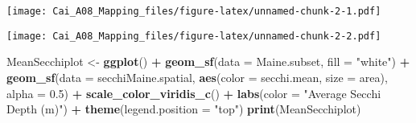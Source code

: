 \documentclass[]{article}
\newenvironment{Shaded}{\begin{snugshade}}{\end{snugshade}}
\newcommand{\CommentTok}[1]{\textcolor[rgb]{0.56,0.35,0.01}{\textit{#1}}}
\newcommand{\DataTypeTok}[1]{\textcolor[rgb]{0.13,0.29,0.53}{#1}}
\newcommand{\DecValTok}[1]{\textcolor[rgb]{0.00,0.00,0.81}{#1}}
\newcommand{\FloatTok}[1]{\textcolor[rgb]{0.00,0.00,0.81}{#1}}
\newcommand{\KeywordTok}[1]{\textcolor[rgb]{0.13,0.29,0.53}{\textbf{#1}}}
\newcommand{\NormalTok}[1]{#1}
\newcommand{\OperatorTok}[1]{\textcolor[rgb]{0.81,0.36,0.00}{\textbf{#1}}}
\newcommand{\StringTok}[1]{\textcolor[rgb]{0.31,0.60,0.02}{#1}}
\begin{document}
\texttt{[image: Cai\_A08\_Mapping\_files/figure-latex/unnamed-chunk-2-1.pdf]}

\begin{Shaded}
\end{Shaded}

\texttt{[image: Cai\_A08\_Mapping\_files/figure-latex/unnamed-chunk-2-2.pdf]}

\begin{Shaded}
\begin{Highlighting}[]
\NormalTok{MeanSecchiplot <-}\StringTok{ }\KeywordTok{ggplot}\NormalTok{() }\OperatorTok{+}
\StringTok{  }\KeywordTok{geom_sf}\NormalTok{(}\DataTypeTok{data =}\NormalTok{ Maine.subset, }\DataTypeTok{fill =} \StringTok{"white"}\NormalTok{) }\OperatorTok{+}
\StringTok{  }\KeywordTok{geom_sf}\NormalTok{(}\DataTypeTok{data =}\NormalTok{ secchiMaine.spatial, }\KeywordTok{aes}\NormalTok{(}\DataTypeTok{color =}\NormalTok{ secchi.mean, }\DataTypeTok{size =}\NormalTok{ area),}
          \DataTypeTok{alpha =} \FloatTok{0.5}\NormalTok{) }\OperatorTok{+}
\StringTok{  }\KeywordTok{scale_color_viridis_c}\NormalTok{() }\OperatorTok{+}
\StringTok{  }\KeywordTok{labs}\NormalTok{(}\DataTypeTok{color =} \StringTok{"Average Secchi Depth (m)"}\NormalTok{) }\OperatorTok{+}
\StringTok{  }\KeywordTok{theme}\NormalTok{(}\DataTypeTok{legend.position =} \StringTok{"top"}\NormalTok{)}
\KeywordTok{print}\NormalTok{(MeanSecchiplot)}
\end{Highlighting}
\end{Shaded}
\end{document}
